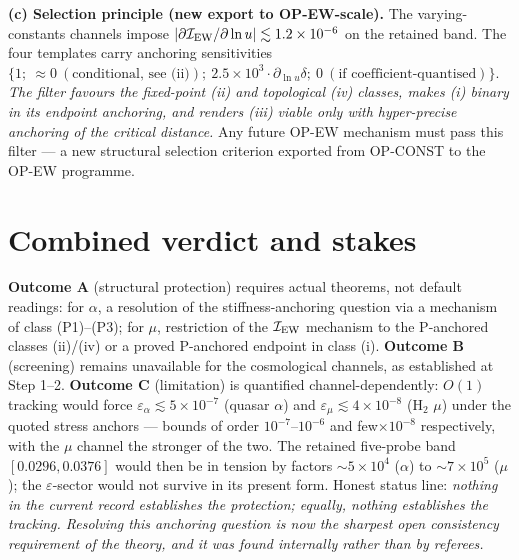\documentclass[11pt,a4paper]{article}
\begin{document}
\textbf{(c) Selection principle (new export to OP-EW-scale).} The varying-constants
channels impose $|\partial\mathcal I_{\rm EW}/\partial\ln u|\lesssim1.2\times
10^{-6}$ on the retained band. The four templates carry anchoring sensitivities
$\{1;\ \approx0\ (\text{conditional, see (ii)});\ 2.5\times10^{3}\cdot\partial_{\ln
u}\delta;\ 0\ (\text{if coefficient-quantised})\}$. \emph{The filter favours the fixed-point
(ii) and topological (iv) classes, makes (i) binary in its endpoint anchoring, and
renders (iii) viable only with hyper-precise anchoring of the critical distance.}
Any future OP-EW mechanism must pass this filter --- a new structural selection
criterion exported from OP-CONST to the OP-EW programme.

\section{Combined verdict and stakes}
\textbf{Outcome A} (structural protection) requires actual theorems, not default
readings: for $\alpha$, a resolution of the stiffness-anchoring question via a
mechanism of class (P1)--(P3); for $\mu$, restriction of the
$\mathcal I_{\rm EW}$ mechanism to the P-anchored classes (ii)/(iv) or a proved
P-anchored endpoint in class (i). \textbf{Outcome B} (screening) remains
unavailable for the cosmological channels, as established at Step 1--2.
\textbf{Outcome C} (limitation) is quantified channel-dependently: $O(1)$ tracking
would force $\varepsilon_\alpha\lesssim5\times10^{-7}$ (quasar $\alpha$) and
$\varepsilon_\mu\lesssim4\times10^{-8}$ (H$_2$ $\mu$) under the quoted stress
anchors --- bounds of order $10^{-7}$--$10^{-6}$ and few$\times10^{-8}$
respectively, with the $\mu$ channel the stronger of the two. The retained
five-probe band $[0.0296,0.0376]$ would then be in tension by factors
$\sim5\times10^{4}$ ($\alpha$) to $\sim7\times10^{5}$ ($\mu$); the
$\varepsilon$-sector would not survive in its present form. Honest status line:
\emph{nothing in the current record establishes the protection; equally, nothing
establishes the tracking. Resolving this anchoring question is now the sharpest
open consistency requirement of the theory, and it was found internally rather
than by referees.}
\end{document}
